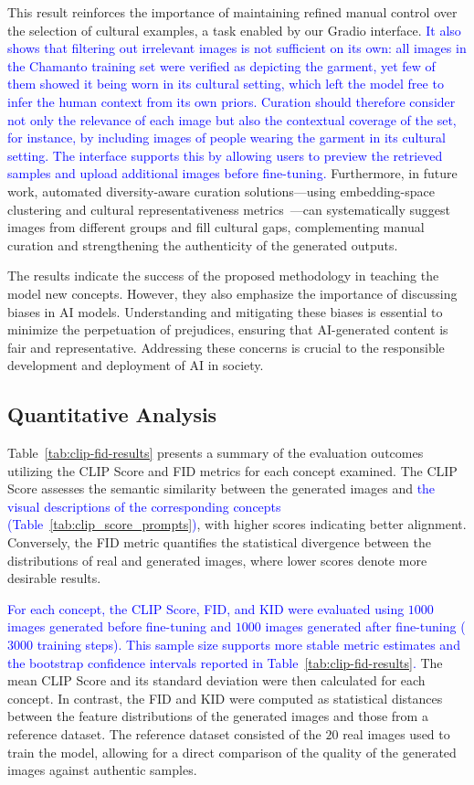 \documentclass[pdflatex,sn-mathphys-num]{sn-jnl}%
\theoremstyle{thmstyleone}%
\theoremstyle{thmstyletwo}%
\theoremstyle{thmstylethree}%
\begin{document}
This result reinforces the importance of maintaining refined manual control over the selection of cultural examples, a task enabled by our Gradio interface. \textcolor{blue}{It also shows that filtering out irrelevant images is not sufficient on its own: all images in the Chamanto training set were verified as depicting the garment, yet few of them showed it being worn in its cultural setting, which left the model free to infer the human context from its own priors. Curation should therefore consider not only the relevance of each image but also the contextual coverage of the set, for instance, by including images of people wearing the garment in its cultural setting. The interface supports this by allowing users to preview the retrieved samples and upload additional images before fine-tuning.} Furthermore, in future work, automated diversity-aware curation solutions—using embedding-space clustering and cultural representativeness metrics~\cite{luccioni2023stablebiasanalyzingsocietal}—can systematically suggest images from different groups and fill cultural gaps, complementing manual curation and strengthening the authenticity of the generated outputs.


The results indicate the success of the proposed methodology in teaching the model new concepts. However, they also emphasize the importance of discussing biases in AI models. Understanding and mitigating these biases is essential to minimize the perpetuation of prejudices, ensuring that AI-generated content is fair and representative. Addressing these concerns is crucial to the responsible development and deployment of AI in society.


\subsection{Quantitative Analysis}

Table~\ref{tab:clip-fid-results} presents a summary of the evaluation outcomes utilizing the CLIP Score and FID metrics for each concept examined. The CLIP Score assesses the semantic similarity between the generated images and \textcolor{blue}{the visual descriptions of the corresponding concepts (Table~\ref{tab:clip_score_prompts})}, with higher scores indicating better alignment. Conversely, the FID metric quantifies the statistical divergence between the distributions of real and generated images, where lower scores denote more desirable results.

\textcolor{blue}{For each concept, the CLIP Score, FID, and KID were evaluated using $1000$ images generated before fine-tuning and $1000$ images generated after fine-tuning ($3000$ training steps). This sample size supports more stable metric estimates and the bootstrap confidence intervals reported in Table~\ref{tab:clip-fid-results}.} The mean CLIP Score and its standard deviation were then calculated for each concept. In contrast, the FID and KID were computed as statistical distances between the feature distributions of the generated images and those from a reference dataset. The reference dataset consisted of the $20$ real images used to train the model, allowing for a direct comparison of the quality of the generated images against authentic samples.
\end{document}
